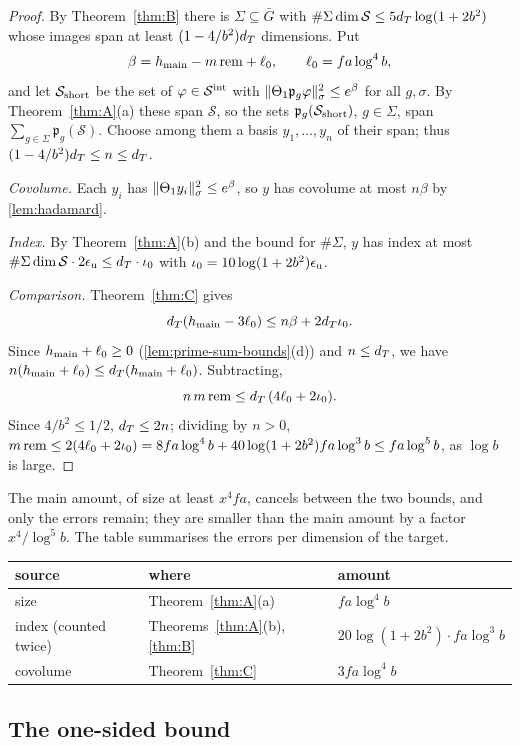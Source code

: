 \begin{proof}
By Theorem~\ref{thm:B} there is $\Sigma\subseteq\bar G$ with
$\#\Sigma\dim\mathcal S\le5d_T\log(1+2b^2)$ whose images span at least $(1-4/b^2)d_T$ dimensions. Put
\[
  \beta=h_{\mathrm{main}}-m\,\mathrm{rem}+\ell_0,\qquad\ell_0=fa\log^4b,
\]
and let $\mathcal S_{\rm short}$ be the set of $\varphi\in\mathcal S^{\rm int}$ with
$\lVert \Theta_1\mathfrak p_g\varphi\rVert^2_\sigma\le e^\beta$ for all $g,\sigma$. By
Theorem~\ref{thm:A}(a) these span $\mathcal S$, so the sets $\mathfrak p_g(\mathcal S_{\rm short})$,
$g\in \Sigma$, span $\sum_{g\in \Sigma}\mathfrak p_g(\mathcal S)$. Choose among them a basis
$y_1,\dots,y_n$ of their span; thus $(1-4/b^2)d_T\le n\le d_T$.

\emph{Covolume.} Each $y_i$ has $\lVert \Theta_1y_i\rVert^2_\sigma\le e^\beta$, so $y$ has covolume at most
$n\beta$ by \cref{lem:hadamard}.

\emph{Index.} By Theorem~\ref{thm:A}(b) and the bound for $\#\Sigma$, $y$ has index at most
$\#\Sigma\dim\mathcal S\cdot2\epsilon_{\mathrm{u}}\le d_T\cdot\iota_0$ with $\iota_0=10\log(1+2b^2)\epsilon_{\mathrm{u}}$.

\emph{Comparison.} Theorem~\ref{thm:C} gives
\[
  d_T(h_{\mathrm{main}}-3\ell_0)\le n\beta+2d_T\iota_0.
\]
Since $h_{\mathrm{main}}+\ell_0\ge0$ (\cref{lem:prime-sum-bounds}(d)) and $n\le d_T$, we have
$n(h_{\mathrm{main}}+\ell_0)\le d_T(h_{\mathrm{main}}+\ell_0)$. Subtracting,
\[
  n\,m\,\mathrm{rem}\le d_T\,(4\ell_0+2\iota_0).
\]
Since $4/b^2\le1/2$, $d_T\le2n$; dividing by $n>0$,
$m\,\mathrm{rem}\le2(4\ell_0+2\iota_0)=8fa\log^4b+40\log(1+2b^2)fa\log^3b\le fa\log^5b$, as $\log b$ is
large.
\end{proof}

The main amount, of size at least $x^4fa$, cancels between the two bounds, and only the errors
remain; they are smaller than the main amount by a factor $x^4/\log^5b$. The table summarises the
errors per dimension of the target.
\begin{center}
\begin{tabular}{lll}
\toprule
source & where & amount\\
\midrule
size & Theorem~\ref{thm:A}(a) & $fa\log^4b$\\
index (counted twice) & Theorems~\ref{thm:A}(b), \ref{thm:B} & $20\log(1+2b^2)\cdot fa\log^3b$\\
covolume & Theorem~\ref{thm:C} & $3fa\log^4b$\\
\bottomrule
\end{tabular}
\end{center}

\subsection{The one-sided bound}\label{ss:one-sided-bound}

